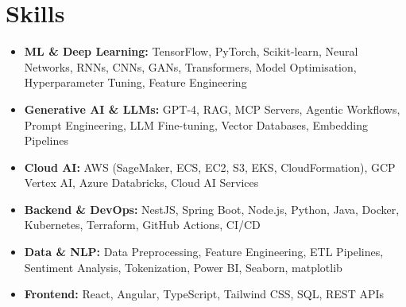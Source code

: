 







\section{Skills}
{\begin{itemize}[label=\textbullet]
\item {\textbf{ML \& Deep Learning:} TensorFlow, PyTorch, Scikit-learn, Neural Networks, RNNs, CNNs, GANs, Transformers, Model Optimisation, Hyperparameter Tuning, Feature Engineering}
\item {\textbf{Generative AI \& LLMs:} GPT-4, RAG, MCP Servers, Agentic Workflows, Prompt Engineering, LLM Fine-tuning, Vector Databases, Embedding Pipelines}
\item {\textbf{Cloud AI:} AWS (SageMaker, ECS, EC2, S3, EKS, CloudFormation), GCP Vertex AI, Azure Databricks, Cloud AI Services}
\item {\textbf{Backend \& DevOps:} NestJS, Spring Boot, Node.js, Python, Java, Docker, Kubernetes, Terraform, GitHub Actions, CI/CD}
\item {\textbf{Data \& NLP:} Data Preprocessing, Feature Engineering, ETL Pipelines, Sentiment Analysis, Tokenization, Power BI, Seaborn, matplotlib}
\item {\textbf{Frontend:} React, Angular, TypeScript, Tailwind CSS, SQL, REST APIs}
\end{itemize}}




